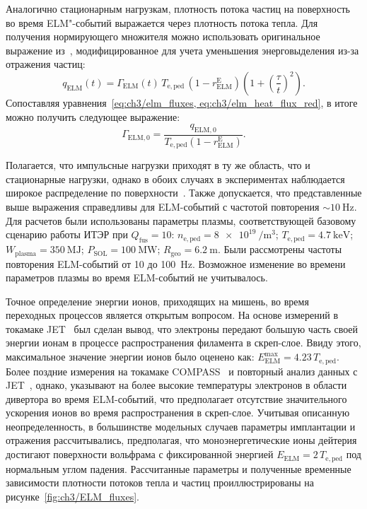 Аналогично стационарным нагрузкам, плотность потока частиц на поверхность во время ELM"-событий выражается через плотность потока тепла. Для получения нормирующего множителя можно использовать оригинальное выражение из~\cite{Fundamenski2006, Moulton2013}, модифицированное для учета уменьшения энерговыделения из-за отражения частиц:
\begin{equation}
	\label{eq:ch3/elm_heat_flux_red}
	q_{\mathrm{ELM}}(t)=\Gamma_{\mathrm{ELM}}(t)\,T_{\mathrm{e,ped}}\,(1-r_{\mathrm{ELM}}^{\mathrm{E}})\left(1+\left(\frac{\tau}{t}\right)^2\right).
\end{equation}
Сопоставляя уравнения~\cref{eq:ch3/elm_fluxes, eq:ch3/elm_heat_flux_red}, в итоге можно получить следующее выражение:
\begin{equation}
	\Gamma_{\mathrm{ELM,0}}=\frac{q_{\mathrm{ELM,0}}}{T_{\mathrm{e,ped}}(1-r_{\mathrm{ELM}}^{\mathrm{E}})}.
\end{equation}

Полагается, что импульсные нагрузки приходят в ту же область, что и стационарные нагрузки, однако в обоих случаях в экспериментах наблюдается широкое распределение по поверхности~\cite{Pitts2019, Orrico2023, Eich2017}. Также допускается, что представленные выше выражения справедливы для ELM-событий с частотой повторения $\sim\SI{10}{\hertz}$. Для расчетов были использованы параметры плазмы, соответствующей базовому сценарию работы ИТЭР при $Q_\mathrm{fus}=10$: $n_{\mathrm{e,ped}}=\SI{8e19}{\per\meter\cubed}$; $T_{\mathrm{e,ped}}=\SI{4.7}{\kilo\electronvolt}$; $W_{\mathrm{plasma}}=\SI{350}{\mega\joule}$; $P_{\mathrm{SOL}}=\SI{100}{\mega\watt}$; $R_{\mathrm{geo}}=\SI{6.2}{\meter}$. Были рассмотрены частоты повторения ELM-событий от \num{10} до \SI{100}{\hertz}. Возможное изменение во времени параметров плазмы во время ELM-событий не учитывалось.

Точное определение энергии ионов, приходящих на мишень, во время переходных процессов является открытым вопросом. На основе измерений в токамаке JET~\cite{Guillemaut2015, Guillemaut2018} был сделан вывод, что электроны передают большую часть своей энергии ионам в процессе распространения филамента в скреп-слое. Ввиду этого, максимальное значение энергии ионов было оценено как: $E_{\mathrm{ELM}}^{\mathrm{max}}=4.23\,T_{\mathrm{e,ped}}$. Более поздние измерения на токамаке COMPASS~\cite{Adamek2020} и повторный анализ данных с JET~\cite{Horacek2023}, однако, указывают на более высокие температуры электронов в области дивертора во время ELM-событий, что предполагает отсутствие значительного ускорения ионов во время распространения в скреп-слое. Учитывая описанную неопределенность, в большинстве модельных случаев параметры имплантации и отражения рассчитывались, предполагая, что моноэнергетические ионы дейтерия достигают поверхности вольфрама с фиксированной энергией $E_{\mathrm{ELM}}=2\,T_{\mathrm{e,ped}}$ под нормальным углом падения. Рассчитанные параметры и полученные временные зависимости плотности потоков тепла и частиц проиллюстрированы на рисунке~\ref{fig:ch3/ELM_fluxes}.

